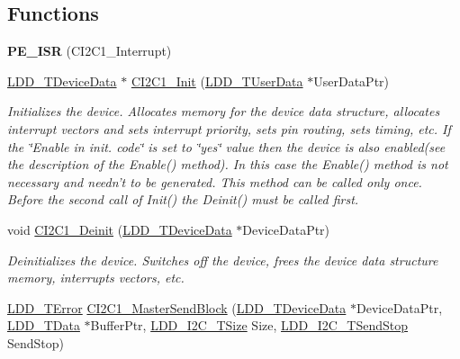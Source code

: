\subsection*{Functions}
\begin{DoxyCompactItemize}
\item 
\hypertarget{group___c_i2_c1__module_ga45d62347cf6ec11bd2f79fcfa621b448}{{\bfseries P\-E\-\_\-\-I\-S\-R} (C\-I2\-C1\-\_\-\-Interrupt)}\label{group___c_i2_c1__module_ga45d62347cf6ec11bd2f79fcfa621b448}

\item 
\hyperlink{group___p_e___types__module_gac5cf1362f1f0e3a2ce71b1bf2276d091}{L\-D\-D\-\_\-\-T\-Device\-Data} $\ast$ \hyperlink{group___c_i2_c1__module_ga340c0a885f1e994269dd5f33fc616f32}{C\-I2\-C1\-\_\-\-Init} (\hyperlink{group___p_e___types__module_ga0b66a73f87238a782318aa0be7578e35}{L\-D\-D\-\_\-\-T\-User\-Data} $\ast$User\-Data\-Ptr)
\begin{DoxyCompactList}\small\item\em Initializes the device. Allocates memory for the device data structure, allocates interrupt vectors and sets interrupt priority, sets pin routing, sets timing, etc. If the \char`\"{}\-Enable in init. code\char`\"{} is set to \char`\"{}yes\char`\"{} value then the device is also enabled(see the description of the Enable() method). In this case the Enable() method is not necessary and needn't to be generated. This method can be called only once. Before the second call of Init() the Deinit() must be called first. \end{DoxyCompactList}\item 
void \hyperlink{group___c_i2_c1__module_gabc03b5a52833888a39c4e7c7f84632c9}{C\-I2\-C1\-\_\-\-Deinit} (\hyperlink{group___p_e___types__module_gac5cf1362f1f0e3a2ce71b1bf2276d091}{L\-D\-D\-\_\-\-T\-Device\-Data} $\ast$Device\-Data\-Ptr)
\begin{DoxyCompactList}\small\item\em Deinitializes the device. Switches off the device, frees the device data structure memory, interrupts vectors, etc. \end{DoxyCompactList}\item 
\hyperlink{group___p_e___types__module_ga24c2b045fd04e79e85f261ce4df35588}{L\-D\-D\-\_\-\-T\-Error} \hyperlink{group___c_i2_c1__module_gaa461c589e2573dab219dae622c1f9ea4}{C\-I2\-C1\-\_\-\-Master\-Send\-Block} (\hyperlink{group___p_e___types__module_gac5cf1362f1f0e3a2ce71b1bf2276d091}{L\-D\-D\-\_\-\-T\-Device\-Data} $\ast$Device\-Data\-Ptr, \hyperlink{group___p_e___types__module_gade8ef9401405bd941b6da738b807f980}{L\-D\-D\-\_\-\-T\-Data} $\ast$Buffer\-Ptr, \hyperlink{group___p_e___types__module_gaa7fd2bc3f1f93e051058f9e70349c2b9}{L\-D\-D\-\_\-\-I2\-C\-\_\-\-T\-Size} Size, \hyperlink{group___p_e___types__module_gacac4ade6fbcd28c9ddcd864242063ec8}{L\-D\-D\-\_\-\-I2\-C\-\_\-\-T\-Send\-Stop} Send\-Stop)

\end{DoxyCompactItemize}
